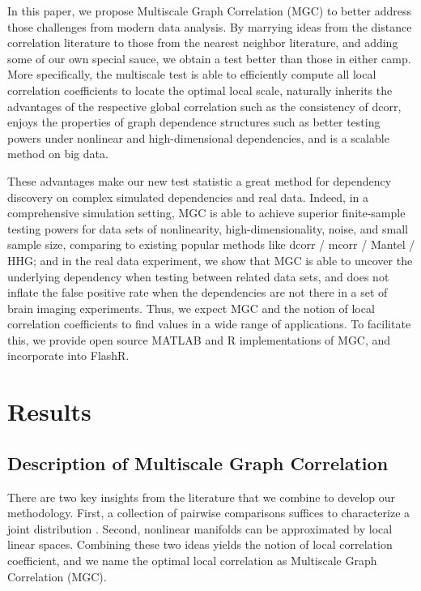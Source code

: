 \documentclass[11pt]{article}
\begin{document}
In this paper, we propose Multiscale Graph Correlation (MGC) to better address those challenges from modern data analysis. By marrying ideas from the distance correlation literature to those from the nearest neighbor literature, and adding some of our own special sauce, we obtain a test better than those in either camp.  More specifically,  the multiscale test is able to efficiently compute all local correlation coefficients to locate the optimal local scale, naturally inherits the advantages of the respective global correlation such as the consistency of dcorr, enjoys the properties of graph dependence structures such as better testing powers under nonlinear and high-dimensional dependencies, and is a scalable method on big data. 

These advantages make our new test statistic a great method for dependency discovery on complex simulated dependencies and real data. Indeed, in a comprehensive simulation setting, MGC is able to achieve superior finite-sample testing powers for data sets of nonlinearity, high-dimensionality, noise, and small sample size, comparing to existing popular methods like dcorr / mcorr / Mantel / HHG; and in the real data experiment, we show that MGC is able to uncover the underlying dependency when testing between related data sets,  and does not inflate the false positive rate when the dependencies are not there in a set of brain imaging experiments. Thus, we expect MGC and the notion of local correlation coefficients to find values in a wide range of applications.  To facilitate this, we provide open source MATLAB and R implementations of MGC, and incorporate into FlashR.

\section{Results}
\label{main}
\subsection{Description of Multiscale Graph Correlation}
\label{main1}
There are two key insights from the literature that we combine to develop our methodology.  First, a collection of pairwise comparisons  suffices to characterize a joint distribution \cite{Maa1996}.  Second, nonlinear manifolds can be approximated by local linear spaces.  Combining these two ideas yields the notion of local correlation coefficient, and we name the optimal local correlation as Multiscale Graph Correlation (MGC).  
\end{document}
